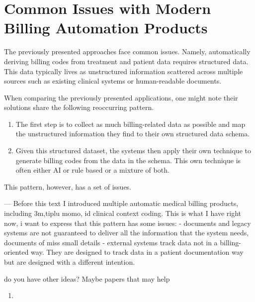 \section{Common Issues with Modern Billing Automation Products}\label{sec:common-issues-with-modern-billing-automation-products}

The previously presented approaches face common issues.
Namely, automatically deriving billing codes from treatment and patient data requires structured data.
This data typically lives as unstructured information scattered across multiple sources such as existing clinical systems or human-readable documents.

When comparing the previously presented applications, one might note their solutions share the following reoccurring pattern.
\begin{enumerate}
    \item The first step is to collect as much billing-related data as possible and map the unstructured information they find to their own structured data schema.
    \item Given this structured dataset, the systems then apply their own technique to generate billing codes from the data in the schema.
    This own technique is often either AI or rule based or a mixture of both.
\end{enumerate}

This pattern, however, has a set of issues.

---
Before this text I introduced multiple automatic medical billing products, including 3m,tiplu momo, id clinical context coding.
This is what I have right now, i want to express that this pattern has some issues:
- documents and legacy systems are not guaranteed to deliver all the information that the system needs, documents of miss small details
- external systems track data not in a billing-oriented way. They are designed to track data in a patient documentation way but are designed with a different intention.

do you have other ideas? Maybe papers that may help


\begin{enumerate}
    \item
\end{enumerate}
